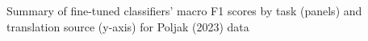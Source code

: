 Summary of fine-tuned classifiers' macro F1 scores by task (panels) and translation source (y-axis) for Poljak (2023) data \label{fig:f1_scores_poljak_2022}
